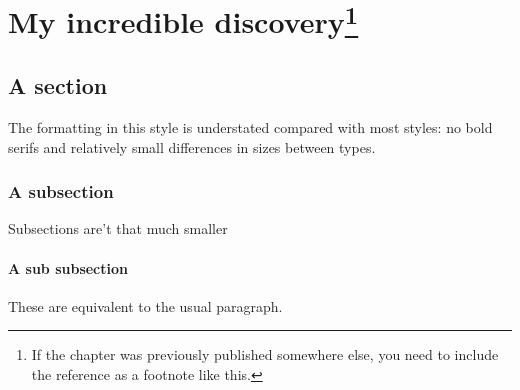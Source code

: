 \chapter[My incredible discovery]{My incredible discovery\footnote{If the chapter was previously published somewhere else, you need to include the reference as a footnote like this.}}
\label{chap:incredible-discovery}

\section{A section}

The formatting in this style is understated compared with most styles:
no bold serifs and relatively small differences in sizes between types.

\subsection{A subsection}

Subsections are't that much smaller

\subsubsection{A sub subsection}

These are equivalent to the usual paragraph.


